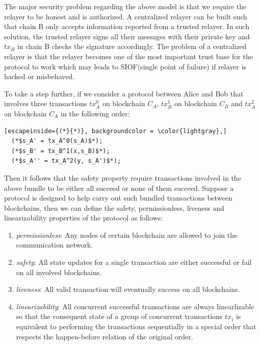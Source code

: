 \documentclass[pageno]{jpaper}
\begin{document}
The major security problem regarding the above model is that we require the relayer to be honest and is authorized. A centralized relayer can be built such that chain B only accepts information reported from a trusted relayer. In such solution, the trusted relayer signs all their messages with their private key and $tx_B$ in chain B checks the signature accordingly. The problem of a centralized relayer is that the relayer becomes one of the most important trust base for the protocol to work which may leads to SIOF(single point of failure) if relayer is hacked or misbehaved.

To take a step further, if we consider a protocol between Alice and Bob that involves three transactions $tx_A^0$ on blockchain $C_A$, $tx_B^1$ on blockchain $C_B$ and $tx_A^2$ on blockchain $C_A$ in the following order:
\begin{lstlisting}[escapeinside={(*}{*)}, backgroundcolor = \color{lightgray},]
  (*$s_A' = tx_A^0(s_A)$*);
  (*$s_B' = tx_B^1(x,s_B)$*);
  (*$s_A'' = tx_A^2(y, s_A')$*);
\end{lstlisting}
Then it follows that the safety property require transactions involved in the above bundle to be either all succeed or none of them succeed. Suppose a protocol is designed to help carry out such bundled transactions between blockchains, then we can define the safety, permissionless, liveness and linearizability properties of the protocol as follows:

\begin{enumerate}[leftmargin=*]
\item {\it permissionless}: Any nodes of certain blockchain are allowed to join the communication network.
\item {\it safety}: All state updates for a single transaction are either successful or fail on all involved blockchains.
\item {\it liveness}: All valid transaction will eventually success on all blockchains.
\item {\it linearizability}: All concurrent successful transactions are always linearlizable so that the consequent state of a group of concurrent transactions $tx_i$ is equivalent to performing the transactions sequentially in a special order that respects the happen-before relation of the original order.
\end{enumerate}
\end{document}
